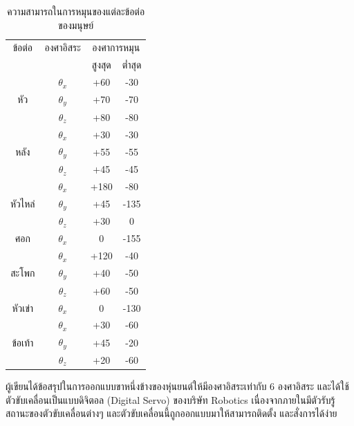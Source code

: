 \begin{table}[ht]
	\centering
	\begin{tabular}{|c|c|c|c|}
		\hline
		{ข้อต่อ}&{องศาอิสระ}&\multicolumn{2}{c|}{องศาการหมุน}\\
		\cline{3-4}
		{}                                     & {}         & {สูงสุด} & {ต่ำสุด} \\
		\hline
		\multirow{3}{*}{หัว}             & $\theta_x$ & +60                  & -30                  \\
		\cline{3-4}
		                                       & $\theta_y$ & +70                  & -70                  \\
		\cline{3-4}
		                                       & $\theta_z$ & +80                  & -80                  \\
		\hline
		\multirow{3}{*}{หลัง}          & $\theta_x$ & +30                  & -30                  \\
		\cline{3-4}
		                                       & $\theta_y$ & +55                  & -55                  \\
		\cline{3-4}
		                                       & $\theta_z$ & +45                  & -45                  \\
		\hline
		\multirow{3}{*}{หัวไหล่} & $\theta_x$ & +180                 & -80                  \\
		\cline{3-4}
		                                       & $\theta_y$ & +45                  & -135                 \\
		\cline{3-4}
		                                       & $\theta_z$ & +30                  & 0                    \\
		\hline
		{ศอก}                            & $\theta_x$ & 0                    & -155                 \\
		\hline
		\multirow{3}{*}{สะโพก}       & $\theta_x$ & +120                 & -40                  \\
		\cline{3-4}
		                                       & $\theta_y$ & +40                  & -50                  \\
		\cline{3-4}
		                                       & $\theta_z$ & +60                  & -50                  \\
		\hline
        {หัวเข่า}                & $\theta_x$ & 0                    & -130                 \\
        \hline
		\multirow{3}{*}{ข้อเท้า} & $\theta_x$ & +30                  & -60                  \\
		\cline{3-4}
		                                       & $\theta_y$ & +45                  & -20                  \\
		\cline{3-4}
		                                       & $\theta_z$ & +20                  & -60                  \\
		\hline
	\end{tabular}
	\caption{ความสามารถในการหมุนของแต่ละข้อต่อของมนุษย์}
	\label{tab:human_joint_limit}
\end{table}

ผู้เขียนได้ข้อสรุปในการออกแบบขาหนึ่งข้างของหุ่นยนต์ให้มีองศาอิสระเท่ากับ 6 องศาอิสระ และได้ใช้ตัวขับเคลื่อนเป็นแบบดิจิตอล (Digital Servo) ของบริษัท Robotics เนื่องจากภายในมีตัวรับรู้สถานะของตัวขับเคลื่อนต่างๆ และตัวขับเคลื่อนนี้ถูกออกแบบมาให้สามารถติดตั้ง และสั่งการได้ง่าย

